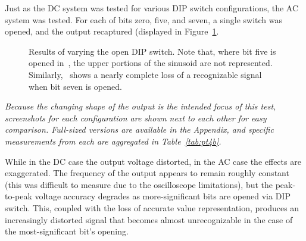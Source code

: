 Just as the DC system was tested for various DIP switch configurations, the AC system was tested.  For each of bits zero, five, and seven, a single switch was opened, and the output recaptured (displayed in Figure~\ref{fig:pt4b}.
%
\begin{figure}[H]
	\centering
	\quad
	\quad

	\parbox{.8\textwidth}{
	\caption[\SI{400}{\hertz} Sine Wave --- DIP Switches]{Results of varying the open DIP switch.  Note that, where bit five is opened in~, the upper portions of the sinusoid are not represented.  Similarly,~ shows a nearly complete loss of a recognizable signal when bit seven is opened.}
	\label{fig:pt4b}}
\end{figure}
%
\emph{Because the changing shape of the output is the intended focus of this test, screenshots for each configuration are shown next to each other for easy comparison.  Full-sized versions are available in the Appendix, and specific measurements from each are aggregated in Table~\ref{tab:pt4b}.}
%
\begin{table}[H]
	\centering
	
	\parbox{.6\textwidth}{
	\caption[\SI{400}{\hertz} DIP Switches]{Measured output of a varying state of DIP switch positions for a~\SI{400}{\hertz} sinusoidal input.}
	\label{tab:pt4b}}
\end{table}
%
While in the DC case the output voltage distorted, in the AC case the effects are exaggerated.  The frequency of the output appears to remain roughly constant (this was difficult to measure due to the oscilloscope limitations), but the peak-to-peak voltage accuracy degrades as more-significant bits are opened via DIP switch.  This, coupled with the loss of accurate value representation, produces an increasingly distorted signal that becomes almost unrecognizable in the case of the most-significant bit's opening.
